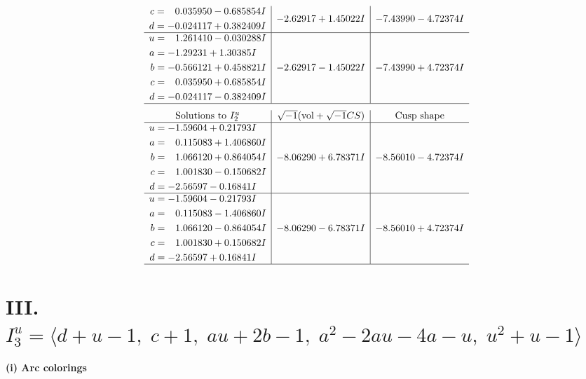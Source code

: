 \documentclass[1p]{elsarticle_modified}
\theoremstyle{definition}
\newcommand{\I}{\sqrt{-1}}
\begin{document}
$$\begin{array}{c|c|c}
\begin{aligned}
c &= \phantom{-}0.035950 - 0.685854 I \\
d &= -0.024117 + 0.382409 I\end{aligned}
 & -2.62917 + 1.45022 I & -7.43990 - 4.72374 I \\ \hline\begin{aligned}
u &= \phantom{-}1.261410 - 0.030288 I \\
a &= -1.29231 + 1.30385 I \\
b &= -0.566121 + 0.458821 I \\
c &= \phantom{-}0.035950 + 0.685854 I \\
d &= -0.024117 - 0.382409 I\end{aligned}
 & -2.62917 - 1.45022 I & -7.43990 + 4.72374 I\\
 \hline 
 \end{array}$$\newpage$$\begin{array}{c|c|c}  
\text{Solutions to }I^u_{2}& \I (\text{vol} + \sqrt{-1}CS) & \text{Cusp shape}\\
 \hline 
\begin{aligned}
u &= -1.59604 + 0.21793 I \\
a &= \phantom{-}0.115083 + 1.406860 I \\
b &= \phantom{-}1.066120 + 0.864054 I \\
c &= \phantom{-}1.001830 - 0.150682 I \\
d &= -2.56597 - 0.16841 I\end{aligned}
 & -8.06290 + 6.78371 I & -8.56010 - 4.72374 I \\ \hline\begin{aligned}
u &= -1.59604 - 0.21793 I \\
a &= \phantom{-}0.115083 - 1.406860 I \\
b &= \phantom{-}1.066120 - 0.864054 I \\
c &= \phantom{-}1.001830 + 0.150682 I \\
d &= -2.56597 + 0.16841 I\end{aligned}
 & -8.06290 - 6.78371 I & -8.56010 + 4.72374 I\\
 \hline 
 \end{array}$$\newpage\newpage\renewcommand{\arraystretch}{1}
\centering \section*{III. $I^u_{3}= \langle d+u-1,\;c+1,\;a u+2 b-1,\;a^2-2 a u-4 a- u,\;u^2+u-1 \rangle$}
\flushleft \textbf{(i) Arc colorings}\\
\end{document}
